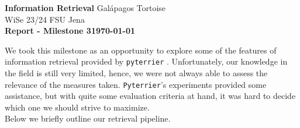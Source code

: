 \documentclass[DIN, pagenumber=false, fontsize=11pt, parskip=half]{scrartcl}
\newcommand{\mytitle}[1]{{\noindent\Large\textbf{#1}}}
\begin{document}
\noindent\textbf{Information Retrieval} \hfill Galápagos Tortoise\\
WiSe 23/24 \hfill FSU Jena\\

\mytitle{Report - Milestone 3\hfill \today}


We took this milestone as an opportunity to explore some of the features of information retrieval provided by \texttt{pyterrier} \cite{pyterrier2020ictir}. Unfortunately, our knowledge in the field is still very limited, hence, we were not always able to assess the relevance of the measures taken. \texttt{Pyterrier}'s experiments provided some assistance, but with quite some evaluation criteria at hand, it was hard to decide which one we should strive to maximize.\\ 
Below we briefly outline our retrieval pipeline.\\
\end{document}

